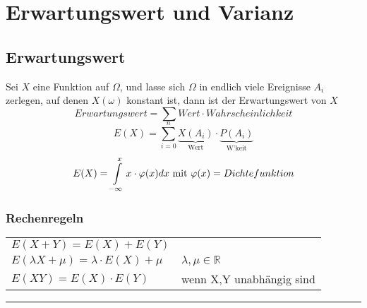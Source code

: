 \section{Erwartungswert und Varianz}

\subsection{Erwartungswert }
\begin{minipage}[t]{9cm}
Sei $X$ eine Funktion auf $\Omega$, und lasse sich $\Omega$ in endlich viele
Ereignisse $A_i$ zerlegen, auf denen $X(\omega)$ konstant ist, dann ist der
Erwartungswert von $X$ 
\[Erwartungswert = \sum Wert \cdot Wahrscheinlichkeit\] 
\[\boxed{E(X)=\sum\limits_{i=0}^n \underbrace{X(A_i)}_{\text{Wert}}\cdot
\underbrace{P(A_i)}_{\text{W'keit}}}\] 
\[E(X) = \int\limits_{-\infty}^x x \cdot \varphi(x) dx$ mit $\varphi(x) =
Dichtefunktion\]
\end{minipage}
\hspace{1cm}
\begin{minipage}[t]{9cm}
\subsubsection{Rechenregeln }
\begin{tabular}{ll}
  $E(X+Y)=E(X)+E(Y)$ \\
  $E(\lambda X + \mu) = \lambda \cdot E(X) + \mu$ & $\lambda, \mu \in
  \mathbb{R}$ \\
  $E(XY) = E(X)\cdot E(Y)$ & wenn X,Y unabhängig sind \\
\end{tabular}
\end{minipage}
\vspace{1mm} %
\hrule       %
\vspace{2mm} %

